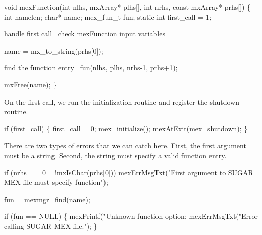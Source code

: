 \nwenddocs{}\plusendmoddef
void mexFunction(int nlhs, mxArray* plhs[],
                 int nrhs, const mxArray* prhs[])
\{
    int          namelen;
    char*        name;
    mex_fun_t    fun;
    static int   first_call = 1;

    \LA{}handle first call~{\nwtagstyle{}}\RA{}        
    \LA{}check \code{}mexFunction\edoc{} input variables~{\nwtagstyle{}}\RA{}

    name = mx_to_string(prhs[0]);

    \LA{}find the function entry~{\nwtagstyle{}}\RA{}
    fun(nlhs, plhs, nrhs-1, prhs+1);

    mxFree(name);
\}

\nwendcode{}\nwdocspar

On the first call, we run the initialization routine and register
the shutdown routine.

\nwenddocs{}\endmoddef
if (first_call) \{
    first_call = 0;
    mex_initialize();
    mexAtExit(mex_shutdown);
\}

\nwendcode{}\nwdocspar

There are two types of errors that we can catch here.  First, the
first argument must be a string.  Second, the string must specify
a valid function entry.


\nwenddocs{}\endmoddef
if (nrhs == 0 || !mxIsChar(prhs[0]))
    mexErrMsgTxt("First argument to SUGAR MEX file must specify function");
\nwendcode{}\nwdocspar

\nwenddocs{}\endmoddef
fun = mexmgr_find(name);

if (fun == NULL) \{
    mexPrintf("Unknown function option: %
    mexErrMsgTxt("Error calling SUGAR MEX file.");
\}

